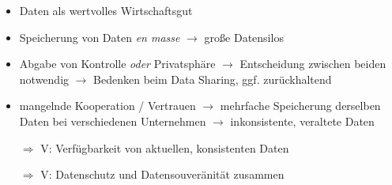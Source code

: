 \vspace{1cm}

\begin{itemize}
    \item Daten als wertvolles Wirtschaftsgut
    \item Speicherung von Daten \emph{en masse} $\to$ große Datensilos
    \item Abgabe von Kontrolle \emph{oder} Privatsphäre $\to$ Entscheidung zwischen beiden notwendig $\to$ Bedenken beim Data Sharing, ggf. zurückhaltend
    \item mangelnde Kooperation / Vertrauen $\to$ mehrfache Speicherung derselben Daten bei verschiedenen Unternehmen $\to$ inkonsistente, veraltete Daten
    \item[$\Rightarrow$] V: Verfügbarkeit von aktuellen, konsistenten Daten
    \item[$\Rightarrow$] V: Datenschutz und Datensouveränität zusammen
\end{itemize}
